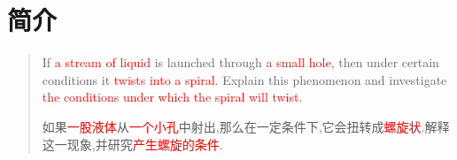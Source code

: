 \documentclass[UTF8]{gapd}
\begin{document}
\maketitle


\section{简介}
\label{sec:Introduction}
\begin{quote}
	If \textcolor{red}{a stream of liquid} is launched through \textcolor{red}{a small hole}, then under certain conditions it \textcolor{red}{twists into a spiral}. Explain this phenomenon and investigate \textcolor{red}{the conditions under which the spiral will twist}.
	
	如果\textcolor{red}{一股液体}从\textcolor{red}{一个小孔}中射出,那么在一定条件下,它会扭转成\textcolor{red}{螺旋状}.解释这一现象,并研究\textcolor{red}{产生螺旋的条件}.
\end{quote}



%

\end{document}
